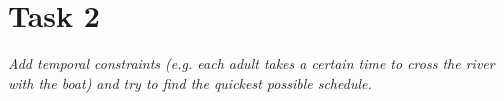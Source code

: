 \section{Task 2}
\label{sec:task2}
\textit{Add temporal constraints (e.g. each adult takes a certain time to cross the river with the boat) and try to find the quickest possible schedule.}